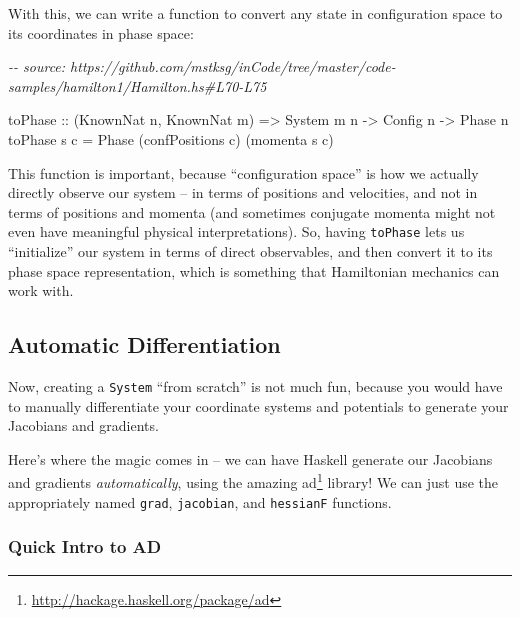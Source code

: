 \documentclass[]{article}
\newenvironment{Shaded}{}{}
\newcommand{\CommentTok}[1]{\textcolor[rgb]{0.38,0.63,0.69}{\textit{#1}}}
\newcommand{\DataTypeTok}[1]{\textcolor[rgb]{0.56,0.13,0.00}{#1}}
\newcommand{\NormalTok}[1]{#1}
\newcommand{\OtherTok}[1]{\textcolor[rgb]{0.00,0.44,0.13}{#1}}
\renewcommand{\href}[2]{#2\footnote{\url{#1}}}
\begin{document}
With this, we can write a function to convert any state in configuration space
to its coordinates in phase space:

\begin{Shaded}
\begin{Highlighting}[]
\CommentTok{{-}{-} source: https://github.com/mstksg/inCode/tree/master/code{-}samples/hamilton1/Hamilton.hs\#L70{-}L75}

\NormalTok{toPhase}
\OtherTok{    ::}\NormalTok{ (}\DataTypeTok{KnownNat}\NormalTok{ n, }\DataTypeTok{KnownNat}\NormalTok{ m)}
    \OtherTok{=>} \DataTypeTok{System}\NormalTok{ m n}
    \OtherTok{{-}>} \DataTypeTok{Config}\NormalTok{ n}
    \OtherTok{{-}>} \DataTypeTok{Phase}\NormalTok{ n}
\NormalTok{toPhase s c }\OtherTok{=} \DataTypeTok{Phase}\NormalTok{ (confPositions c) (momenta s c)}
\end{Highlighting}
\end{Shaded}

This function is important, because ``configuration space'' is how we actually
directly observe our system -- in terms of positions and velocities, and not in
terms of positions and momenta (and sometimes conjugate momenta might not even
have meaningful physical interpretations). So, having \texttt{toPhase} lets us
``initialize'' our system in terms of direct observables, and then convert it to
its phase space representation, which is something that Hamiltonian mechanics
can work with.

\hypertarget{automatic-differentiation}{%
\subsection{Automatic Differentiation}\label{automatic-differentiation}}

Now, creating a \texttt{System} ``from scratch'' is not much fun, because you
would have to manually differentiate your coordinate systems and potentials to
generate your Jacobians and gradients.

Here's where the magic comes in -- we can have Haskell generate our Jacobians
and gradients \emph{automatically}, using the amazing
\href{http://hackage.haskell.org/package/ad}{ad} library! We can just use the
appropriately named \texttt{grad}, \texttt{jacobian}, and \texttt{hessianF}
functions.

\hypertarget{quick-intro-to-ad}{%
\subsubsection{Quick Intro to AD}\label{quick-intro-to-ad}}
\end{document}
